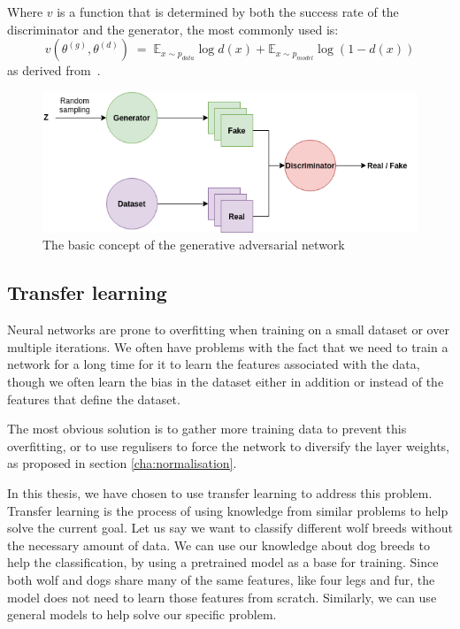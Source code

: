 Where $v$ is a function that is determined by both the success rate of the discriminator and the generator, the most commonly used is:
\begin{equation} 
    v(\theta^{(g)},\theta^{(d)}) \; = \; \mathds{E}_{x\sim p_{data}}\log{d(x)} + \mathds{E}_{x\sim p_{model}}\log{(1 - d(x))} 
\end{equation}
as derived from~\cite{Goodfellow:2014:GAN:2969033.2969125}.


\begin{figure}[ht!]
    \centering
    \includegraphics[scale=0.6]{background/figures/GAN.png}
    \caption{The basic concept of the generative adversarial network}
    \label{fig:GAN}
\end{figure}



    
\subsection{Transfer learning}
Neural networks are prone to overfitting when training on a small dataset or over multiple iterations. We often have problems with the fact that we need to train a network for a long time for it to learn the features associated with the data, though we often learn the bias in the dataset either in addition or instead of the features that define the dataset.

The most obvious solution is to gather more training data to prevent this overfitting, or to use regulisers to force the network to diversify the layer weights, as proposed in section \ref{cha:normalisation}.

In this thesis, we have chosen to use transfer learning to address this problem. Transfer learning is the process of using knowledge from similar problems to help solve the current goal.  Let us say we want to classify different wolf breeds without the necessary amount of data. We can use our knowledge about dog breeds to help the classification, by using a pretrained model as a base for training. Since both wolf and dogs share many of the same features, like four legs and fur, the model does not need to learn those features from scratch.
Similarly, we can use general models to help solve our specific problem.



